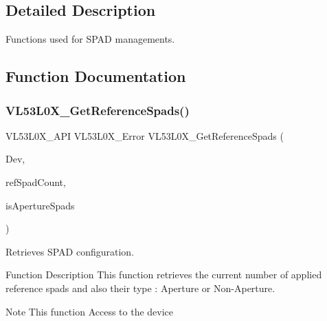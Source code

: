 \subsection{Detailed Description}
Functions used for S\+P\+AD managements. 



\subsection{Function Documentation}
\mbox{\label{group__VL53L0X__SPADfunctions__group_ga47d6d7d3c3d8baaadb136e5c57037899}} 
\subsubsection{\texorpdfstring{V\+L53\+L0\+X\+\_\+\+Get\+Reference\+Spads()}{VL53L0X\_GetReferenceSpads()}}
{\footnotesize\ttfamily V\+L53\+L0\+X\+\_\+\+A\+PI V\+L53\+L0\+X\+\_\+\+Error V\+L53\+L0\+X\+\_\+\+Get\+Reference\+Spads (\begin{DoxyParamCaption}\item[{\hyperlink{group__VL53L0X__platform__group_ga2d6405308b1dd524b462f1b8fb97d167}{V\+L53\+L0\+X\+\_\+\+D\+EV}}]{Dev,  }\item[{\hyperlink{vl53l0x__types_8h_a435d1572bf3f880d55459d9805097f62}{uint32\+\_\+t} $\ast$}]{ref\+Spad\+Count,  }\item[{\hyperlink{vl53l0x__types_8h_aba7bc1797add20fe3efdf37ced1182c5}{uint8\+\_\+t} $\ast$}]{is\+Aperture\+Spads }\end{DoxyParamCaption})}



Retrieves S\+P\+AD configuration. 

\begin{DoxyParagraph}{Function Description}
This function retrieves the current number of applied reference spads and also their type \+: Aperture or Non-\/\+Aperture.
\end{DoxyParagraph}
\begin{DoxyNote}{Note}
This function Access to the device
\end{DoxyNote}

